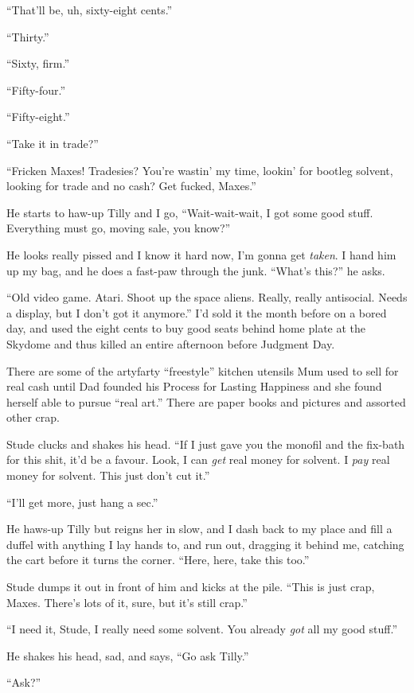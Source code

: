 ``That'll be, uh, sixty-eight cents.''

``Thirty.''

``Sixty, firm.''

``Fifty-four.''

``Fifty-eight.''

``Take it in trade?''

``Fricken Maxes! Tradesies? You're wastin' my time, lookin' for bootleg 
solvent, looking for trade and no cash? Get fucked, Maxes.''

He starts to haw-up Tilly and I go,
``Wait-wait-wait, I got some good stuff. Everything must go, moving sale, you 
know?''

He looks really pissed and I know it hard now, I'm gonna get
\emph{taken}. I hand him up my bag, and he does a fast-paw through
the junk. ``What's this?'' he asks.

``Old video game. Atari. Shoot up the space aliens. Really, really antisocial. 
Needs a display, but I don't got it anymore.''
I'd sold it the month before on a bored day, and used the eight
cents to buy good seats behind home plate at the Skydome and thus
killed an entire afternoon before Judgment Day.

There are some of the artyfarty ``freestyle'' kitchen utensils Mum
used to sell for real cash until Dad founded his Process for
Lasting Happiness and she found herself able to pursue
``real art.'' There are paper books and pictures and assorted other
crap.

Stude clucks and shakes his head.
``If I just gave you the monofil and the fix-bath for this shit, it'd be a 
favour. Look, I can \emph{get} real money for solvent. I \emph{pay} real money 
for solvent. This just don't cut it.''

``I'll get more, just hang a sec.''

He haws-up Tilly but reigns her in slow, and I dash back to my
place and fill a duffel with anything I lay hands to, and run out,
dragging it behind me, catching the cart before it turns the
corner. ``Here, here, take this too.''

Stude dumps it out in front of him and kicks at the pile.
``This is just crap, Maxes. There's lots of it, sure, but it's still crap.''

``I need it, Stude, I really need some solvent. You already \emph{got} all my 
good stuff.''

He shakes his head, sad, and says, ``Go ask Tilly.''

``Ask?''

